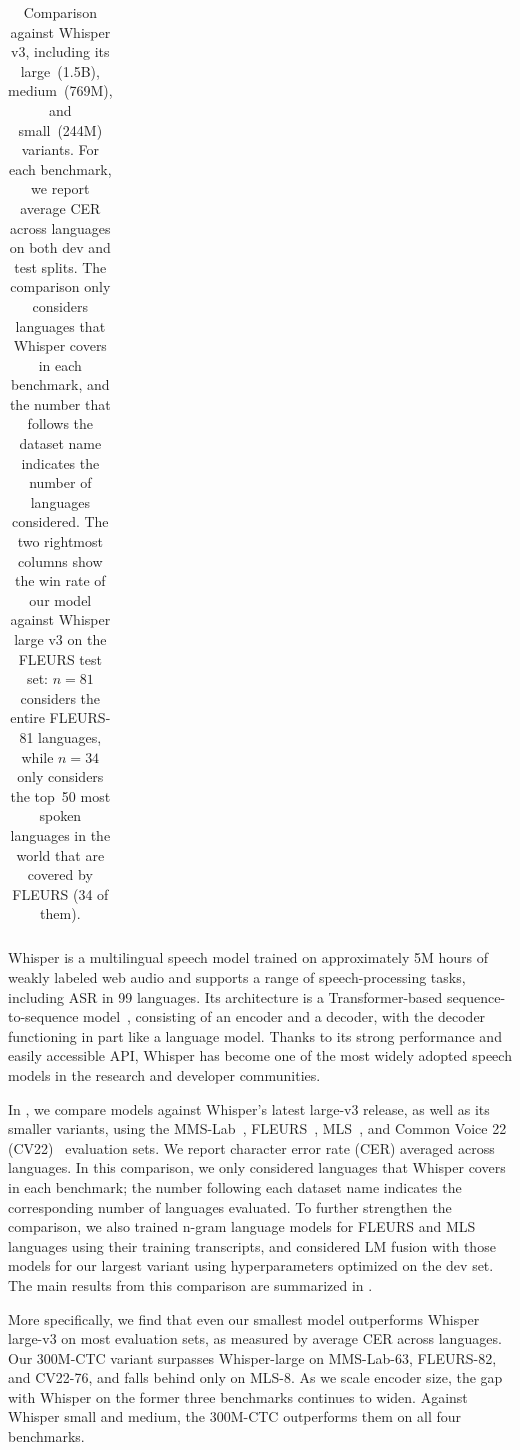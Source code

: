 \documentclass[]{fairmeta}
\begin{document}
\begin{table}[htbp]
\begin{tabular}{lrrrrrrrr|cc}
    \bottomrule
  \end{tabular}
  \caption{Comparison against Whisper v3, including its large~(1.5B), medium~(769M), and small~(244M) variants.  For each benchmark, we report average CER across languages on both dev and test splits. The comparison only considers languages that Whisper covers in each benchmark, and the number that follows the dataset name indicates the number of languages considered. The two rightmost columns show the win rate of our model against Whisper large v3 on the FLEURS test set: $n=81$ considers the entire FLEURS-81 languages, while $n=34$ only considers the top~50 most spoken languages in the world that are covered by FLEURS (34 of them).}
  \label{tab:vs_whisper}
\end{table}

Whisper is a multilingual speech model trained on approximately 5M hours of weakly labeled web audio and supports a range of speech-processing tasks, including ASR in 99 languages. Its architecture is a Transformer-based sequence-to-sequence model~\citep{sutskever2014sequence}, consisting of an encoder and a decoder, with the decoder functioning in part like a language model. Thanks to its strong performance and easily accessible API, Whisper has become one of the most widely adopted speech models in the research and developer communities.

In , we compare \OmniASR models against Whisper’s latest large-v3 release, as well as its smaller variants, using the MMS-Lab~\citep{pratap2024scaling}, FLEURS~\citep{conneau2023fleurs}, MLS~\citep{pratap2020mls}, and Common Voice 22 (CV22)~\citep{ardila2020common} evaluation sets. We report character error rate (CER) averaged across languages. In this comparison, we only considered languages that Whisper covers in each benchmark; the number following each dataset name indicates the corresponding number of languages evaluated. To further strengthen the comparison, we also trained n-gram language models for FLEURS and MLS languages using their training transcripts, and considered LM fusion with those models for our largest variant using hyperparameters optimized on the dev set. The main results from this comparison are summarized in .

More specifically, we find that even our smallest model outperforms Whisper large-v3 on most evaluation sets, as measured by average CER across languages. Our 300M-CTC variant surpasses Whisper-large on MMS-Lab-63, FLEURS-82, and CV22-76, and falls behind only on MLS-8. As we scale encoder size, the gap with Whisper on the former three benchmarks continues to widen. Against Whisper small and medium, the 300M-CTC outperforms them on all four benchmarks.
\end{document}
